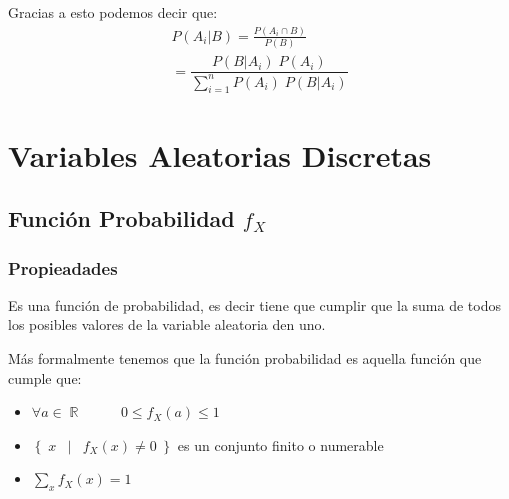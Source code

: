 \documentclass[12pt, fleqn]{report}                             %
\DeclareMathOperator \Space     {\quad}                         %
\DeclareMathOperator \MegaSpace {\quad \quad}                   %
\DeclareMathOperator \MiniSpace {\;}                            %
\newcommand \Such           {\MiniSpace | \MiniSpace}           %
\theoremstyle{break}                                            %
\DeclareMathOperator \Reals        {\mathbb{R}}                 %
\newcommand{\Set}[1]            {\left\{ \; #1 \; \right\}}     %
\begin{document}
                Gracias a esto podemos decir que:
                \begin{align*}
                    P(A_i | B) 
                        = \frac{P(A_i \cap B)}{P(B)}                                                        \\
                        = \dfrac{P(B | A_i) \; P(A_i)}{\displaystyle \sum_{i = 1}^n P(A_i) \; P(B | A_i)}
                \end{align*}




        \clearpage
        \section{Variables Aleatorias Discretas}


            \subsection{Función Probabilidad $f_X$}


                \subsubsection{Propieadades}

                    Es una función de probabilidad, es decir tiene que cumplir que la suma de todos los posibles
                    valores de la variable aleatoria den uno.

                    Más formalmente tenemos que la función probabilidad es aquella función que cumple que:
                    \begin{itemize}
                        \item $\forall a \in \Reals \MegaSpace 0 \leq f_X(a) \leq 1$
                        \item $\Set{x \Such f_X(x) \neq 0}$ es un conjunto finito o numerable
                        \item $\displaystyle \sum_x f_X(x) = 1$
                    \end{itemize}
\end{document}
